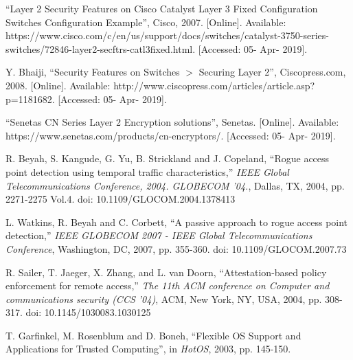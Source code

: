 \documentclass[journal]{IEEEtran}
\begin{document}
\begin{thebibliography}{00}

 ``Layer 2 Security Features on Cisco Catalyst Layer 3 Fixed Configuration Switches
Configuration Example'', Cisco, 2007. [Online]. Available:
https://www.cisco.com/c/en/us/support/docs/switches/catalyst-3750-series-switches/72846-layer2-secftrs-catl3fixed.html.
 [Accessed: 05- Apr- 2019].

 Y. Bhaiji, ``Security Features on Switches $>$ Securing Layer 2'', Ciscopress.com,
2008. [Online]. Available: http://www.ciscopress.com/articles/article.asp?p=1181682. [Accessed: 05-
Apr- 2019].

 ``Senetas CN Series Layer 2 Encryption solutions'', Senetas. [Online]. Available:
https://www.senetas.com/products/cn-encryptors/. [Accessed: 05- Apr- 2019].

 R. Beyah, S. Kangude, G. Yu, B. Strickland and J. Copeland, ``Rogue access point
detection using temporal traffic characteristics,'' \textit{IEEE Global Telecommunications
Conference, 2004. GLOBECOM '04.}, Dallas, TX, 2004, pp. 2271-2275 Vol.4. doi:
10.1109/GLOCOM.2004.1378413

 L. Watkins, R. Beyah and C. Corbett, ``A passive approach to rogue access point
detection,''  \textit{IEEE GLOBECOM 2007 - IEEE Global Telecommunications Conference}, Washington,
DC, 2007, pp. 355-360. doi: 10.1109/GLOCOM.2007.73

 R. Sailer, T. Jaeger, X. Zhang, and L. van Doorn, ``Attestation-based policy
enforcement for remote access,'' \textit{The 11th ACM conference on Computer and communications
security (CCS '04)}, ACM, New York, NY, USA, 2004, pp. 308-317. doi: 10.1145/1030083.1030125

 T. Garfinkel, M. Rosenblum and D. Boneh, ``Flexible OS Support and Applications for
Trusted Computing'', in \textit{HotOS}, 2003, pp. 145-150.

\end{thebibliography}
\end{document}
